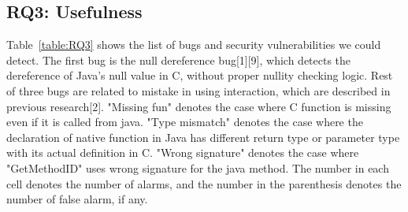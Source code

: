 

\subsection{RQ3: Usefulness}

Table~\ref{table:RQ3} shows the list of bugs and security vulnerabilities we could detect.
The first bug is the null dereference bug[1][9], which detects the dereference of
Java's null value in C, without proper nullity checking logic. Rest of three
bugs are related to mistake in using interaction, which are described in
previous research[2]. "Missing fun" denotes the case where C function is
missing even if it is called from java. "Type mismatch" denotes the case where
the declaration of native function in Java has different return type or
parameter type with its actual definition in C.  "Wrong signature" denotes the
case where "GetMethodID" uses wrong signature for the java method. The
number in each cell denotes the number of alarms, and the number in the
parenthesis denotes the number of false alarm, if any.

